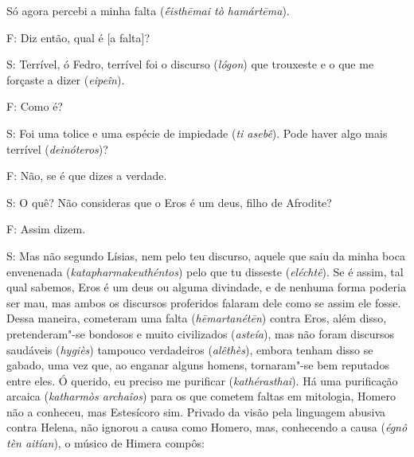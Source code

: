 \bekker{[242d]} Só agora percebi a minha falta (\emph{ḗisthēmai tò
hamártēma}).

F: Diz então, qual é [a falta]?

S: Terrível, ó Fedro, terrível foi o discurso (\emph{lógon}) que
trouxeste e o que me forçaste a dizer (\emph{eipeîn}).

F: Como é?

S: Foi uma tolice e uma espécie de impiedade (\emph{ti
asebê}). Pode haver algo mais
terrível (\emph{deinóteros})?

F: Não, se é que dizes a verdade.

S: O quê? Não consideras que o Eros é um deus, filho de Afrodite?

F: Assim dizem.

S: Mas não segundo Lísias, nem pelo teu discurso, aquele que saiu da
minha boca envenenada (\emph{katapharmakeuthéntos}) pelo que tu disseste
(\emph{eléchtê}). \bekker{[242e]} Se é assim, tal qual sabemos, Eros é um
deus ou alguma divindade, e de nenhuma forma poderia ser mau, mas ambos
os discursos proferidos falaram dele como se assim ele fosse. Dessa
maneira, cometeram uma falta (\emph{hēmartanétēn}) contra Eros, além
disso, pretenderam"-se bondosos e muito civilizados (\emph{asteía}), mas
não foram discursos saudáveis (\emph{hygiès}) tampouco verdadeiros
(\emph{alêthès}), embora tenham disso se gabado, \bekker{[243a]} uma vez que,
ao enganar alguns homens, tornaram"-se bem reputados entre eles. Ó
querido, eu preciso me purificar (\emph{kathérasthai}). Há uma
purificação arcaica (\emph{katharmòs archaîos}) para os que cometem
faltas em mitologia, Homero não a conheceu, mas Estesícoro sim. Privado da visão pela
linguagem abusiva contra Helena, não ignorou a causa como Homero, mas,
conhecendo a causa (\emph{égnô tèn aitían}), o músico de Himera compôs:

